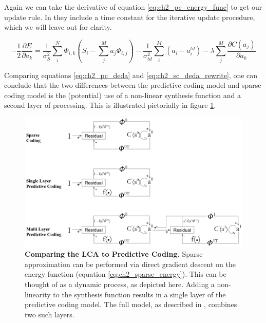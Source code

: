 Again we can take the derivative of equation \eqref{eq:ch2_pc_energy_func} to get our update rule. In \parencite{rao1999predictive} they include a time constant for the iterative update procedure, which we will leave out for clarity.

\begin{equation}\label{eq:ch2_pc_deda}
    - \frac{1}{2}\frac{\partial E}{\partial a_{k}}
    =
        \frac{1}{\sigma_{S}^{2}}\sum\limits_{i}^{N} \Phi_{i,k} \left(S_{i} - \sum\limits_{j}^{M}a_{j} \Phi_{i,j}\right) -
        \frac{1}{\sigma_{td}^{2}}\sum\limits_{i}^{M}(a_{i}-a_{i}^{td}) -
        \lambda \sum\limits_{j}^{M}\frac{\partial C(a_{j})}{\partial a_{k}}
\end{equation}

Comparing equations \eqref{eq:ch2_pc_deda} and \eqref{eq:ch2_sc_deda_rewrite}, one can conclude that the two differences between the predictive coding model and sparse coding model is the (potential) use of a non-linear synthesis function and a second layer of processing. This is illustrated pictorially in figure \ref{fig:ch2_lca_pc_comp}.

\begin{figure}[h]
    \centering
    \includegraphics[width=\textwidth]{./figures/lca_pc_model_comparisons.png}
    \caption{\textbf{Comparing the LCA to Predictive Coding.} Sparse approximation can be performed via direct gradient descent on the energy function (equation \eqref{eq:ch2_sparse_energy}). This can be thought of as a dynamic process, as depicted here. Adding a non-linearity to the synthesis function results in a single layer of the predictive coding model. The full model, as described in \parencite{rao1999predictive}, combines two such layers.}
    \label{fig:ch2_lca_pc_comp}
\end{figure}


